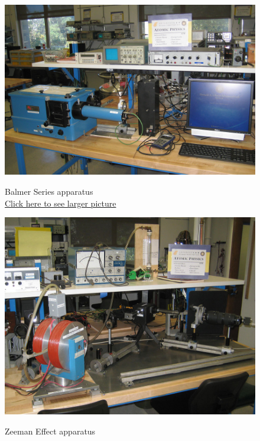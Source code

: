 \documentclass{../lab}
\begin{document}
\begin{figure}[!h]
  \href{http://experimentationlab.berkeley.edu/sites/default/files/images/ATM_Balmer_3490-Crop-Lg.jpg}{\includegraphics[width=\linewidth,keepaspectratio]{images/ATM_Balmer_3490-Crop-Lg.jpg}}
  \caption{Balmer Series apparatus \\ \href{http://experimentationlab.berkeley.edu/sites/default/files/images/ATM_Balmer_3490-Crop-Lg.jpg}{Click here to see larger picture}}
  \label{fig:BalmerApparatus}
\endminipage\hfill
{}
  \href{http://experimentationlab.berkeley.edu/sites/default/files/images/ATM_ZeemanSetup_3492-Crop-Lg.jpg}{\includegraphics[width=\linewidth,keepaspectratio]{images/ATM_ZeemanSetup_3492-Crop-Lg.jpg}}
  \caption{Zeeman Effect apparatus \\
}
\end{figure}
\end{document}
